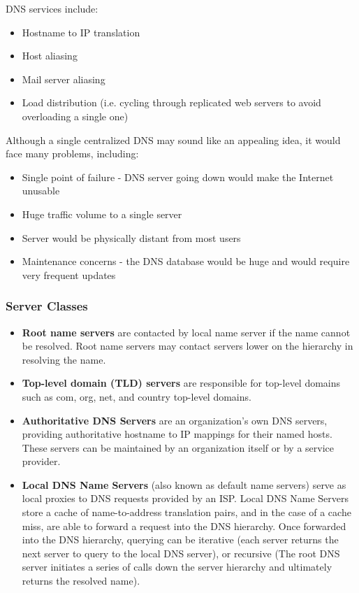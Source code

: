 \documentclass[12pt,titlepage]{article}
\begin{document}
      DNS services include:
      \begin{itemize}
        \item Hostname to IP translation
        \item Host aliasing
        \item Mail server aliasing
        \item Load distribution (i.e. cycling through replicated web servers to avoid overloading a single one)
      \end{itemize}

      Although a single centralized DNS may sound like an appealing idea, it would face many problems, including:
      \begin{itemize}
        \item Single point of failure - DNS server going down would make the Internet unusable
        \item Huge traffic volume to a single server
        \item Server would be physically distant from most users
        \item Maintenance concerns - the DNS database would be huge and would require very frequent updates
      \end{itemize}

    \subsubsection{Server Classes}
      \begin{itemize}
        \item \textbf{Root name servers} are contacted by local name server if the name cannot be resolved. Root name servers may contact servers lower on the hierarchy in
        resolving the name.
        \item \textbf{Top-level domain (TLD) servers} are responsible for top-level domains such as com, org, net, and country top-level domains.
        \item \textbf{Authoritative DNS Servers} are an organization's own DNS servers, providing authoritative hostname to IP mappings for their named hosts. These servers
        can be maintained by an organization itself or by a service provider.
        \item \textbf{Local DNS Name Servers} (also known as default name servers) serve as local proxies to DNS requests provided by an ISP. Local DNS Name Servers store
        a cache of name-to-address translation pairs, and in the case of a cache miss, are able to forward a request into the DNS hierarchy. Once forwarded into the DNS hierarchy,
        querying can be iterative (each server returns the next server to query to the local DNS server), or recursive (The root DNS server initiates a series of calls down the
        server hierarchy and ultimately returns the resolved name).
      \end{itemize}
\end{document}
